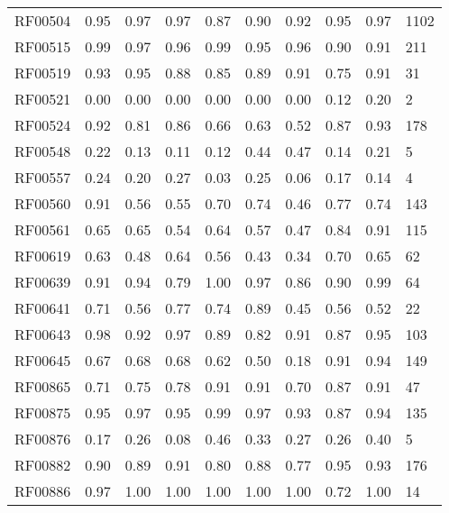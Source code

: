 \begin{tabular}{lrrrrrrrrl}
RF00504      &  0.95 &  0.97 &  0.97 &   0.87 &    0.90 &     0.92 &  0.95 & 0.97 &       1102 \\
RF00515      &  0.99 &  0.97 &  0.96 &   0.99 &    0.95 &     0.96 &  0.90 & 0.91 &        211 \\
RF00519      &  0.93 &  0.95 &  0.88 &   0.85 &    0.89 &     0.91 &  0.75 & 0.91 &         31 \\
RF00521      &  0.00 &  0.00 &  0.00 &   0.00 &    0.00 &     0.00 &  0.12 & 0.20 &          2 \\
RF00524      &  0.92 &  0.81 &  0.86 &   0.66 &    0.63 &     0.52 &  0.87 & 0.93 &        178 \\
RF00548      &  0.22 &  0.13 &  0.11 &   0.12 &    0.44 &     0.47 &  0.14 & 0.21 &          5 \\
RF00557      &  0.24 &  0.20 &  0.27 &   0.03 &    0.25 &     0.06 &  0.17 & 0.14 &          4 \\
RF00560      &  0.91 &  0.56 &  0.55 &   0.70 &    0.74 &     0.46 &  0.77 & 0.74 &        143 \\
RF00561      &  0.65 &  0.65 &  0.54 &   0.64 &    0.57 &     0.47 &  0.84 & 0.91 &        115 \\
RF00619      &  0.63 &  0.48 &  0.64 &   0.56 &    0.43 &     0.34 &  0.70 & 0.65 &         62 \\
RF00639      &  0.91 &  0.94 &  0.79 &   1.00 &    0.97 &     0.86 &  0.90 & 0.99 &         64 \\
RF00641      &  0.71 &  0.56 &  0.77 &   0.74 &    0.89 &     0.45 &  0.56 & 0.52 &         22 \\
RF00643      &  0.98 &  0.92 &  0.97 &   0.89 &    0.82 &     0.91 &  0.87 & 0.95 &        103 \\
RF00645      &  0.67 &  0.68 &  0.68 &   0.62 &    0.50 &     0.18 &  0.91 & 0.94 &        149 \\
RF00865      &  0.71 &  0.75 &  0.78 &   0.91 &    0.91 &     0.70 &  0.87 & 0.91 &         47 \\
RF00875      &  0.95 &  0.97 &  0.95 &   0.99 &    0.97 &     0.93 &  0.87 & 0.94 &        135 \\
RF00876      &  0.17 &  0.26 &  0.08 &   0.46 &    0.33 &     0.27 &  0.26 & 0.40 &          5 \\
RF00882      &  0.90 &  0.89 &  0.91 &   0.80 &    0.88 &     0.77 &  0.95 & 0.93 &        176 \\
RF00886      &  0.97 &  1.00 &  1.00 &   1.00 &    1.00 &     1.00 &  0.72 & 1.00 &         14 \\

\end{tabular}
